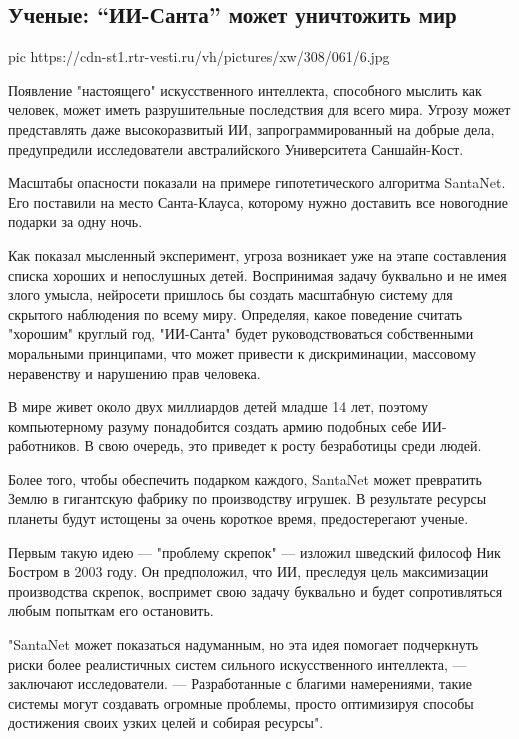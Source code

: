  
 
 
 
 
 
\subsection{Ученые: \enquote{ИИ-Санта} может уничтожить мир}
\label{sec:25_10_2020.news.ru.vesti.1.ii_santa_mir}

\ifcmt
pic https://cdn-st1.rtr-vesti.ru/vh/pictures/xw/308/061/6.jpg
\fi

Появление "настоящего" искусственного интеллекта, способного мыслить как
человек, может иметь разрушительные последствия для всего мира. Угрозу может
представлять даже высокоразвитый ИИ, запрограммированный на добрые дела,
предупредили исследователи австралийского Университета Саншайн-Кост.

Масштабы опасности показали на примере гипотетического алгоритма SantaNet. Его
поставили на место Санта-Клауса, которому нужно доставить все новогодние
подарки за одну ночь.

Как показал мысленный эксперимент, угроза возникает уже на этапе составления
списка хороших и непослушных детей. Воспринимая задачу буквально и не имея
злого умысла, нейросети пришлось бы создать масштабную систему для скрытого
наблюдения по всему миру. Определяя, какое поведение считать "хорошим" круглый
год, "ИИ-Санта" будет руководствоваться собственными моральными принципами, что
может привести к дискриминации, массовому неравенству и нарушению прав
человека.

В мире живет около двух миллиардов детей младше 14 лет, поэтому компьютерному
разуму понадобится создать армию подобных себе ИИ-работников. В свою очередь,
это приведет к росту безработицы среди людей.

Более того, чтобы обеспечить подарком каждого, SantaNet может превратить Землю
в гигантскую фабрику по производству игрушек. В результате ресурсы планеты
будут истощены за очень короткое время, предостерегают ученые.

Первым такую идею — "проблему скрепок" — изложил шведский философ Ник Бостром в
2003 году. Он предположил, что ИИ, преследуя цель максимизации производства
скрепок, воспримет свою задачу буквально и будет сопротивляться любым попыткам
его остановить.

"SantaNet может показаться надуманным, но эта идея помогает подчеркнуть риски
более реалистичных систем сильного искусственного интеллекта, — заключают
исследователи. — Разработанные с благими намерениями, такие системы могут
создавать огромные проблемы, просто оптимизируя способы достижения своих узких
целей и собирая ресурсы".
